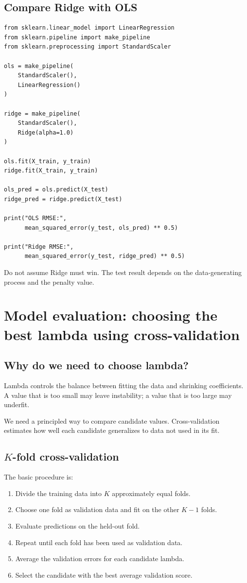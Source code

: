 \documentclass[11pt,a4paper,oneside]{book}
\theoremstyle{remark}
\begin{document}
\section{Compare Ridge with OLS}
\begin{lstlisting}
from sklearn.linear_model import LinearRegression
from sklearn.pipeline import make_pipeline
from sklearn.preprocessing import StandardScaler

ols = make_pipeline(
    StandardScaler(),
    LinearRegression()
)

ridge = make_pipeline(
    StandardScaler(),
    Ridge(alpha=1.0)
)

ols.fit(X_train, y_train)
ridge.fit(X_train, y_train)

ols_pred = ols.predict(X_test)
ridge_pred = ridge.predict(X_test)

print("OLS RMSE:",
      mean_squared_error(y_test, ols_pred) ** 0.5)

print("Ridge RMSE:",
      mean_squared_error(y_test, ridge_pred) ** 0.5)
\end{lstlisting}

Do not assume Ridge must win. The test result depends on the data-generating
process and the penalty value.

\chapter{Model evaluation: choosing the best lambda using cross-validation}

\section{Why do we need to choose lambda?}
Lambda controls the balance between fitting the data and shrinking
coefficients. A value that is too small may leave instability; a value that
is too large may underfit.

We need a principled way to compare candidate values. Cross-validation
estimates how well each candidate generalizes to data not used in its fit.

\section{\texorpdfstring{$K$}{K}-fold cross-validation}
The basic procedure is:
\begin{enumerate}
\item Divide the training data into $K$ approximately equal folds.
\item Choose one fold as validation data and fit on the other $K-1$ folds.
\item Evaluate predictions on the held-out fold.
\item Repeat until each fold has been used as validation data.
\item Average the validation errors for each candidate lambda.
\item Select the candidate with the best average validation score.
\end{enumerate}
\end{document}
